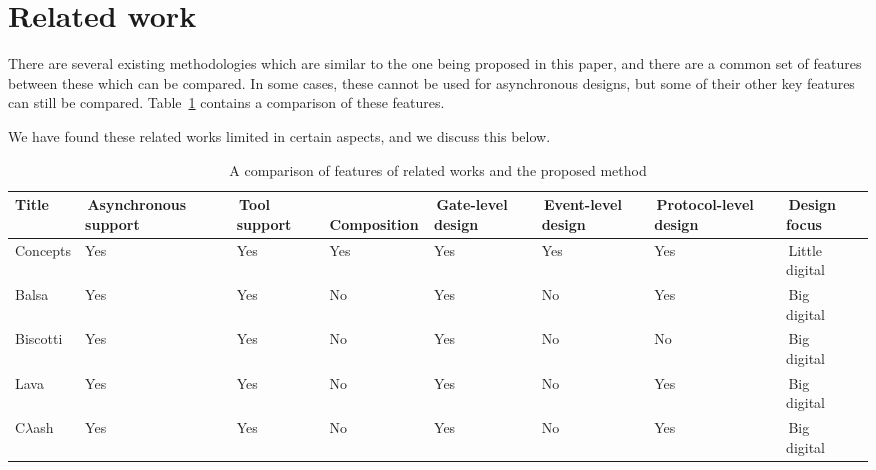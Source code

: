 \documentclass[british,compsoc]{IEEEtran}
\begin{document}
\section{Related work\label{sec:related-work}}

There are several existing methodologies which are similar to the
one being proposed in this paper, and there are a common set of features between these which can be compared.
In some cases, these cannot be used for asynchronous designs, but some of their other key features can still be compared.
Table~\ref{tab:related_work} contains a comparison of these features.

We have found these related works limited in
certain aspects, and we discuss this below.
\begin{table}[t]
\caption{A comparison of features of related works and the proposed method \label{tab:related_work}}
  \centering
  \begin{tabular}[htb]{| m{1.5cm} | m{2cm} | m{1.3cm} | m{1.75cm} | m{1.5cm} | m{1.5cm} | m{1.7cm} | m{1.15cm} |}
  \hline
  Title                       & \,Asynchronous support & \,Tool support  & \,Composition & \,Gate-level design & \,Event-level design & \,Protocol-level design  & \,Design focus \\ \hline \hline
  Concepts              & Yes                               & Yes                 & Yes               & Yes                       & Yes                         & Yes                              & \,Little digital \\ \hline
  Balsa                     & Yes                               & Yes                 & No                & Yes                       & No                          & Yes                              & \,Big\,\,\,\, digital \\ \hline
  Biscotti                  & Yes                               & Yes                 & No                & Yes                       & No                           & No                               & \,Big\,\,\,\, digital \\ \hline
  Lava                      & Yes                               & Yes                 & No                & Yes                       & No                           & Yes                             & \,Big\,\,\,\, digital \\ \hline
  C$\lambda$ash     & Yes                               & Yes                 & No                & Yes                       & No                           & Yes                             & \,Big\,\,\,\, digital \\ \hline

\end{tabular}
\end{table}
\end{document}
